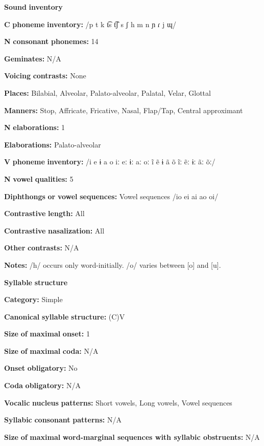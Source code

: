 \begin{styleBody}
\textbf{Sound} \textbf{inventory}

\textbf{C} \textbf{phoneme} \textbf{inventory:} /p t k t͡s t͡ʃ s ʃ h m n ɲ ɾ j ɰ/

\textbf{N} \textbf{consonant} \textbf{phonemes:} 14

\textbf{Geminates:} N/A

\textbf{Voicing} \textbf{contrasts:} None

\textbf{Places:} Bilabial, Alveolar, Palato-alveolar, Palatal, Velar, Glottal

\textbf{Manners:} Stop, Affricate, Fricative, Nasal, Flap/Tap, Central approximant

\textbf{N} \textbf{elaborations:} 1

\textbf{Elaborations:} Palato-alveolar

\textbf{V} \textbf{phoneme} \textbf{inventory:} /i e ɨ a o iː eː ɨː aː oː ĩ ẽ ɨ ã õ ĩː ẽː ɨː ãː õː/

\textbf{N} \textbf{vowel} \textbf{qualities:} 5

\textbf{Diphthongs} \textbf{or} \textbf{vowel} \textbf{sequences:} Vowel sequences /io ei ai ao oi/

\textbf{Contrastive} \textbf{length:} All

\textbf{Contrastive} \textbf{nasalization:} All

\textbf{Other} \textbf{contrasts:} N/A

\textbf{Notes:} /h/ occurs only word-initially. /o/ varies between [o] and [u]. 

\textbf{Syllable} \textbf{structure}

\textbf{Category:} Simple

\textbf{Canonical} \textbf{syllable} \textbf{structure:} (C)V \citep[87-90]{Facundes2000}

\textbf{Size} \textbf{of} \textbf{maximal} \textbf{onset:} 1

\textbf{Size} \textbf{of} \textbf{maximal} \textbf{coda:} N/A

\textbf{Onset} \textbf{obligatory:} No

\textbf{Coda} \textbf{obligatory:} N/A

\textbf{Vocalic} \textbf{nucleus} \textbf{patterns:} Short vowels, Long vowels, Vowel sequences

\textbf{Syllabic} \textbf{consonant} \textbf{patterns:} N/A

\textbf{Size} \textbf{of} \textbf{maximal} \textbf{word{}-marginal sequences with syllabic obstruents:}  N/A


\end{styleBody}
